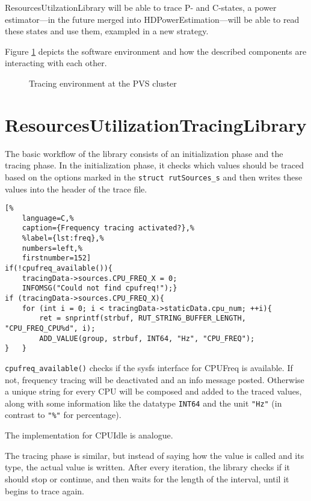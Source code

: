 ResourcesUtilzationLibrary will be able to trace P- and C-states, a power estimator---in the future merged into HDPowerEstimation---will be able to read these states and use them, exampled in a new strategy.

\newpage
\noindent
Figure \ref{fig:wrapper} depicts the software environment and how the described components are interacting with each other.

%
\begin{figure}[h!]
	\centering
	
\newcommand*\Captiontext{Tracing environment at the PVS cluster}
	\caption[\Captiontext]{\Captiontext\cite{minartz}}
	\label{fig:wrapper}
\end{figure}
%

%


\section{ResourcesUtilizationTracingLibrary}
\label{sec:rutl}
The basic workflow of the library consists of an initialization phase and the tracing phase. In the initialization phase, it checks which values should be traced based on the options marked in the \lstinline!struct rutSources_s! and then writes these values into the header of the trace file.
\newpage
\begin{lstlisting}[%
	language=C,%
	caption={Frequency tracing activated?},%
	%label={lst:freq},%
	numbers=left,%
	firstnumber=152]
if(!cpufreq_available()){
	tracingData->sources.CPU_FREQ_X = 0;
	INFOMSG("Could not find cpufreq!");}
if (tracingData->sources.CPU_FREQ_X){
	for (int i = 0; i < tracingData->staticData.cpu_num; ++i){
		ret = snprintf(strbuf, RUT_STRING_BUFFER_LENGTH, "CPU_FREQ_CPU%d", i);
		ADD_VALUE(group, strbuf, INT64, "Hz", "CPU_FREQ");
}	}
\end{lstlisting}
%
\lstinline!cpufreq_available()! checks if the sysfs interface for CPUFreq is available. If not, frequency tracing will be deactivated and an info message posted. Otherwise a unique string for every CPU will be composed and added to the traced values, along with some information like the datatype \lstinline!INT64! and the unit \lstinline!"Hz"! (in contrast to \lstinline!"%"! for percentage).

The implementation for CPUIdle is analogue.

The tracing phase is similar, but instead of saying how the value is called and its type, the actual value is written. After every iteration, the library checks if it should stop or continue, and then waits for the length of the interval, until it begins to trace again.

